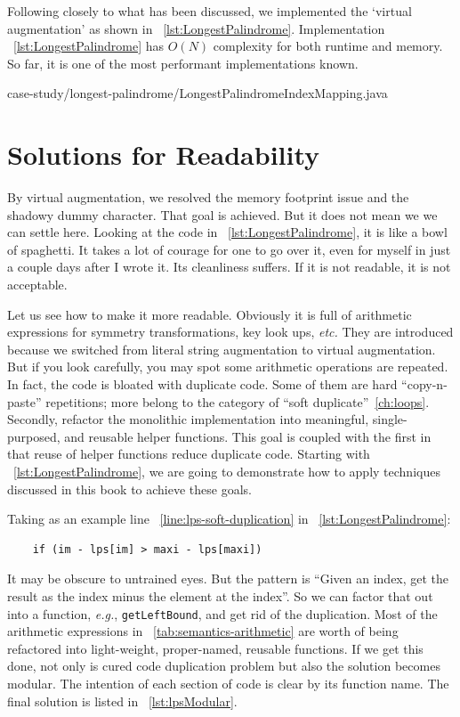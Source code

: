 \documentclass[oneside,11pt]{book}
\theoremstyle{definition}
\theoremstyle{remark}
\newcommand{\code}[1]{\mbox{\lstinline{#1}}}
\begin{document}
Following closely to what has been discussed, we implemented the `virtual augmentation' as
shown in ~\autoref{lst:LongestPalindrome}.
Implementation ~\autoref{lst:LongestPalindrome} has $O(N)$ complexity for both runtime and memory.
So far, it is one of the most performant implementations known.

\begin{clisting}[H]
    
    {case-study/longest-palindrome/LongestPalindromeIndexMapping.java}
\end{clisting}

\section{Solutions for Readability}\label{sec:palindrom.modularized}

By virtual augmentation, we resolved the memory footprint issue and the shadowy dummy character.
That goal is achieved.
But it does not mean we we can settle here.
Looking at the code in ~\autoref{lst:LongestPalindrome}, it is like a bowl of spaghetti.
It takes a lot of courage for one to go over it, even for myself in just a couple days after I wrote
it.
Its cleanliness suffers.
If it is not readable, it is not acceptable.


Let us see how to make it more readable.
Obviously it is full of arithmetic expressions for symmetry
transformations, key look ups, \textit{etc.}
They are introduced because we switched from literal string augmentation to virtual augmentation.
But if you look carefully, you may spot some arithmetic operations are repeated.
In fact, the code is bloated with duplicate code.
Some of them are hard ``copy-n-paste'' repetitions;
more belong to the category of ``soft duplicate''~\autoref{ch:loops}.
Secondly, refactor the monolithic implementation into meaningful, single-purposed, and reusable
helper functions.
This goal is coupled with the first in that reuse of helper functions reduce duplicate code.
Starting with ~\autoref{lst:LongestPalindrome}, we are going to demonstrate
how to apply techniques discussed in this book to achieve these goals.


Taking as an example line ~\autoref{line:lps-soft-duplication} in ~\autoref{lst:LongestPalindrome}:
\begin{lstlisting}
    if (im - lps[im] > maxi - lps[maxi])
\end{lstlisting}
It may be obscure to untrained eyes.
But the pattern is ``Given an index, get the result as the index minus the element
at the index''.
So we can factor that out into a function, \textit{e.g.}, \code{getLeftBound}, and get rid of the
duplication.
Most of the arithmetic expressions in ~\autoref{tab:semantics-arithmetic} are worth of being
refactored into light-weight, proper-named, reusable functions.
If we get this done, not only is cured code duplication problem but also the solution becomes
modular.
The intention of each section of code is clear by its function name.
The final solution is listed in ~\autoref{lst:lpsModular}.
\end{document}
